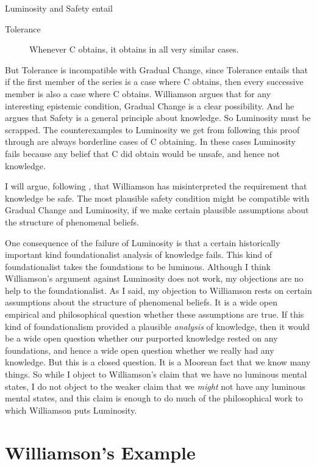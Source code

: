 \noindent Luminosity and Safety entail

\begin{description}
\item[Tolerance] Whenever C obtains, it obtains in all very similar cases.
\end{description}

\noindent But Tolerance is incompatible with Gradual Change, since Tolerance entails that if the first member of the series is a case where C obtains, then every successive member is also a case where C obtains. Williamson argues that for any interesting epistemic condition, Gradual Change is a clear possibility. And he argues that Safety is a general principle about knowledge. So Luminosity must be scrapped. The counterexamples to Luminosity we get from following this proof through are always borderline cases of C obtaining. In these cases Luminosity fails because any belief that C did obtain would be unsafe, and hence not knowledge. 

I will argue, following \citet{Sainsbury1996}, that Williamson has misinterpreted the requirement that knowledge be safe. The most plausible safety condition might be compatible with Gradual Change and Luminosity, if we make certain plausible assumptions about the structure of phenomenal beliefs.

One consequence of the failure of Luminosity is that a certain historically important kind foundationalist analysis of knowledge fails. This kind of foundationalist takes the foundations to be luminous. Although I think Williamson's argument against Luminosity does not work, my objections are no help to the foundationalist. As I said, my objection to Williamson rests on certain assumptions about the structure of phenomenal beliefs. It is a wide open empirical and philosophical question whether these assumptions are true. If this kind of foundationalism provided a plausible \textit{analysis} of knowledge, then it would be a wide open question whether our purported knowledge rested on any foundations, and hence a wide open question whether we really had any knowledge. But this is a closed question. It is a Moorean fact that we know many things. So while I object to Williamson's claim that we have no luminous mental states, I do not object to the weaker claim that we \textit{might} not have any luminous mental states, and this claim is enough to do much of the philosophical work to which Williamson puts Luminosity.

\section{Williamson's Example}

